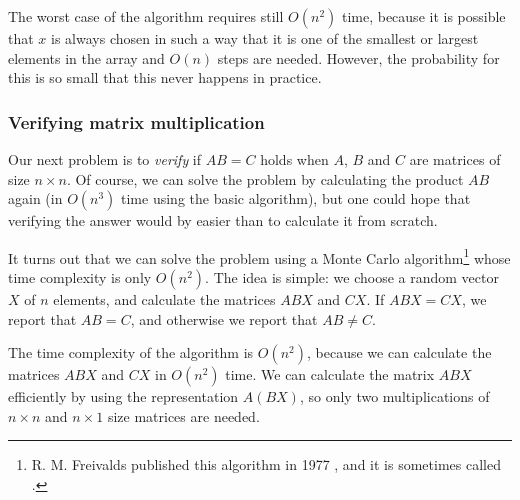 The worst case of the algorithm requires still $O(n^2)$ time,
because it is possible that $x$ is always chosen
in such a way that it is one of the smallest or largest
elements in the array and $O(n)$ steps are needed.
However, the probability for this is so small
that this never happens in practice.

\subsubsection{Verifying matrix multiplication}


Our next problem is to \emph{verify}
if $AB=C$ holds when $A$, $B$ and $C$
are matrices of size $n \times n$.
Of course, we can solve the problem
by calculating the product $AB$ again
(in $O(n^3)$ time using the basic algorithm),
but one could hope that verifying the
answer would by easier than to calculate it from scratch.

It turns out that we can solve the problem
using a Monte Carlo algorithm\footnote{R. M. Freivalds published
this algorithm in 1977 \cite{fre77}, and it is sometimes
called  .} whose
time complexity is only $O(n^2)$.
The idea is simple: we choose a random vector
$X$ of $n$ elements, and calculate the matrices
$ABX$ and $CX$. If $ABX=CX$, we report that $AB=C$,
and otherwise we report that $AB \neq C$.

The time complexity of the algorithm is
$O(n^2)$, because we can calculate the matrices
$ABX$ and $CX$ in $O(n^2)$ time.
We can calculate the matrix $ABX$ efficiently
by using the representation $A(BX)$, so only two
multiplications of $n \times n$ and $n \times 1$
size matrices are needed.


